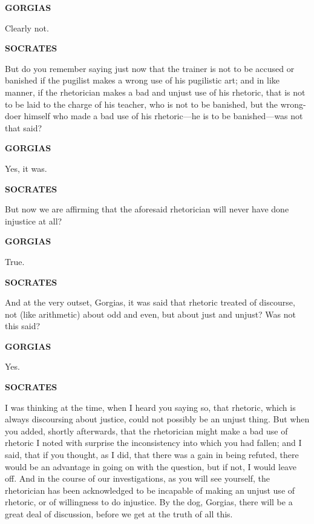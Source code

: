 \documentclass[11pt,letter]{article}
\begin{document}
\par \textbf{GORGIAS}
\par   Clearly not.

\par \textbf{SOCRATES}
\par   But do you remember saying just now that the trainer is not to be accused or banished if the pugilist makes a wrong use of his pugilistic art; and in like manner, if the rhetorician makes a bad and unjust use of his rhetoric, that is not to be laid to the charge of his teacher, who is not to be banished, but the wrong-doer himself who made a bad use of his rhetoric—he is to be banished—was not that said?

\par \textbf{GORGIAS}
\par   Yes, it was.

\par \textbf{SOCRATES}
\par   But now we are affirming that the aforesaid rhetorician will never have done injustice at all?

\par \textbf{GORGIAS}
\par   True.

\par \textbf{SOCRATES}
\par   And at the very outset, Gorgias, it was said that rhetoric treated of discourse, not (like arithmetic) about odd and even, but about just and unjust? Was not this said?

\par \textbf{GORGIAS}
\par   Yes.

\par \textbf{SOCRATES}
\par   I was thinking at the time, when I heard you saying so, that rhetoric, which is always discoursing about justice, could not possibly be an unjust thing. But when you added, shortly afterwards, that the rhetorician might make a bad use of rhetoric I noted with surprise the inconsistency into which you had fallen; and I said, that if you thought, as I did, that there was a gain in being refuted, there would be an advantage in going on with the question, but if not, I would leave off. And in the course of our investigations, as you will see yourself, the rhetorician has been acknowledged to be incapable of making an unjust use of rhetoric, or of willingness to do injustice. By the dog, Gorgias, there will be a great deal of discussion, before we get at the truth of all this.
\end{document}
